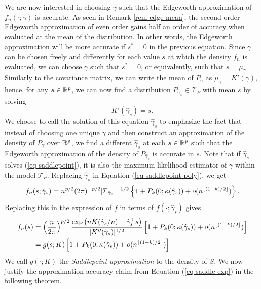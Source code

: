 We are now interested in choosing $\gamma$ such that the Edgeworth approximation of $f_n(\cdot; \gamma)$ is accurate. As seen in Remark \ref{rem-edge-mean}, the second order Edgeworth approximation of even order gains half an order of accuracy when evaluated at the mean of the distribution. In other words, the Edgeworth approximation will be more accurate if $s^* = 0$ in the previous equation. Since $\gamma$ can be chosen freely and differently for each value $s$ at which the density $f_n$ is evaluated, we can choose $\gamma$ such that $s^* = 0$, or equivalently, such that $s = \mu_\gamma$. Similarly to the covariance matrix, we can write the mean of $P_\gamma$ as $\mu_\gamma = K'(\gamma)$, hence, for any $s \in {\mathbb{R}^p}$, we can now find a distribution $P_{\hat\gamma_s} \in \mathcal{T}_P$ with mean $s$ by solving
\begin{equation} \label{eq-saddlepoint}
    K'(\hat\gamma_s) = s.
\end{equation}
We choose to call the solution of this equation $\hat\gamma_s$ to emphasize the fact that instead of choosing one unique $\gamma$ and then construct an approximation of the density of $P_\gamma$ over ${\mathbb{R}^p}$, we find a different $\hat\gamma_s$ at each $s \in {\mathbb{R}^p}$ such that the Edgeworth approximation of the density of $P_{\hat\gamma_s}$ is accurate in $s$. Note that if $\hat\gamma_s$ solves (\ref{eq-saddlepoint}), it is also the maximum likelihood estimator of $\gamma$ within the model $\mathcal{T}_P$. Replacing $\hat\gamma_{s}$ in Equation (\ref{eq-saddlepoint-poly}), we get
\begin{equation*}
    f_n(s; \hat\gamma_s) = n^{p/2}(2\pi)^{-p/2}|\Sigma_{\hat\gamma_s}|^{-1/2}\left\{ 1 + P_k(0; \kappa(\hat\gamma_s)) + o(n^{\lfloor(1-k)/2\rfloor})\right\}.
\end{equation*}
Replacing this in the expression of $f$ in terms of $f(\cdot; \hat\gamma_s)$ gives
\begin{align}
    f_n(s) &= \left(\frac{n}{2\pi}\right)^{p/2} \frac{\exp\left(nK(\hat\gamma_s / n) - \hat\gamma_s^\top s\right)}{|K''(\hat\gamma_s)|^{1/2}}  \left[1 + P_k(0; \kappa(\hat\gamma_s)) + o(n^{\lfloor(1-k)/2\rfloor})\right]\nonumber\\
    &= g(s; K)\left[1 + P_k(0; \kappa(\hat\gamma_s)) + o(n^{\lfloor(1-k)/2\rfloor})\right] \label{eq-saddle-exp}
\end{align}
We call $g(\cdot; K)$ the \textit{Saddlepoint approximation} to the density of $S$. We now justify the approximation accuracy claim from Equation (\ref{eq-saddle-exp}) in the following theorem.

